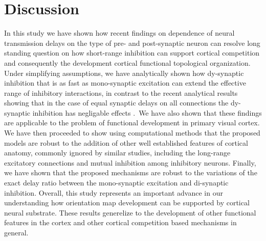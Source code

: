\documentclass[a4paper,10pt]{article}
\begin{document}
\section{Discussion}

In this study we have shown how recent findings on dependence of neural transmission delays on the
type of pre- and post-synaptic neuron \cite{Ohana2012} can resolve long standing question on how short-range inhibition
can support cortical competition and consequently the development cortical functional topological organization.
Under simplifying assumptions, we have analytically shown how dy-synaptic inhibition that is as fast as mono-synaptic 
excitation can extend the effective range of inhibitory interactions, in contrast to the recent analytical 
results showing that in the case of equal synaptic delays on all connections the dy-synaptic inhibition has negligable effects \cite{Muir2014}.\
We have also shown that these findings are applicable to the problem of functional development in primary visual cortex. We have then proceeded 
to show using computational methods that the proposed models are robust to the addition of other well established features of cortical anatomy, commonly 
ignored by similar studies, including the long-range excitatory connections and mutual inhibition among inhibitory neurons. Finally, we have shown 
that the proposed mechanisms are robust to the variations of the exact delay ratio between the mono-synaptic excitation and di-synaptic inhibition. 
Overall, this study represents an important advance in our understanding how orientation map development can be supported by cortical neural substrate. These
results generelize to the development of other functional features in the cortex and other cortical competition based mechanisms in general.
\end{document}
